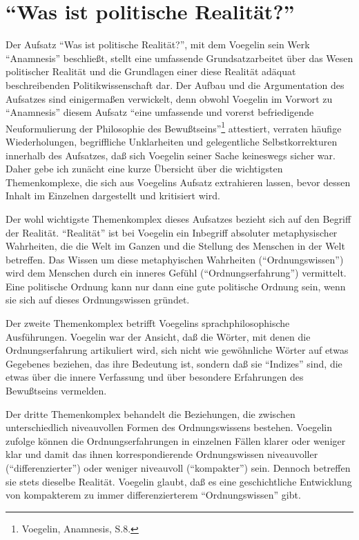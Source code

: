 


\section{"`Was ist politische Realität?"'}  

Der Aufsatz "`Was ist politische Realität?"', mit dem Voegelin sein Werk
"`Anamnesis"' beschließt, stellt eine umfassende Grundsatzarbeitet über das
Wesen politischer Realität und die Grundlagen einer diese Realität adäquat
beschreibenden Politikwissenschaft dar. Der Aufbau und die Argumentation des
Aufsatzes sind einigermaßen verwickelt, denn obwohl Voegelin im Vorwort zu
"`Anamnesis"' diesem Aufsatz "`eine umfassende und vorerst befriedigende
Neuformulierung der Philosophie des Bewußtseins"'\footnote{Voegelin,
  Anamnesis, S.8.} attestiert, verraten häufige Wiederholungen, begriffliche
Unklarheiten und gelegentliche Selbstkorrekturen innerhalb des Aufsatzes, daß
sich Voegelin seiner Sache keineswegs sicher war.  Daher gebe ich zunächt eine
kurze Übersicht über die wichtigsten Themenkomplexe, die sich aus Voegelins
Aufsatz extrahieren lassen, bevor dessen Inhalt im Einzelnen dargestellt und
kritisiert wird.

Der wohl wichtigste Themenkomplex dieses Aufsatzes bezieht sich auf den
Begriff der Realität. "`Realität"' ist bei Voegelin ein Inbegriff
absoluter metaphysischer Wahrheiten, die die Welt im Ganzen und die Stellung
des Menschen in der Welt betreffen.  Das Wissen um diese metaphyischen
Wahrheiten ("`Ordnungswissen"') wird dem Menschen durch ein inneres Gefühl
("`Ordnungserfahrung"') vermittelt. Eine politische Ordnung kann nur dann eine
gute politische Ordnung sein, wenn sie sich auf dieses Ordnungswissen
gründet.

Der zweite Themenkomplex betrifft Voegelins sprachphilosophische
Ausführungen.  Voegelin war der Ansicht, daß die Wörter, mit denen die
Ordnungserfahrung artikuliert wird, sich nicht wie gewöhnliche Wörter
auf etwas Gegebenes beziehen, das ihre Bedeutung ist, sondern daß sie
"`Indizes"' sind, die etwas über die innere Verfassung und über
besondere Erfahrungen des Bewußtseins vermelden.

Der dritte Themenkomplex behandelt die Beziehungen, die zwischen
unterschiedlich niveauvollen Formen des Ordnungswissens bestehen. Voegelin
zufolge können die Ordnungserfahrungen in einzelnen Fällen klarer oder
weniger klar und damit das ihnen korrespondierende Ordnungswissen niveauvoller
("`differenzierter"') oder weniger niveauvoll ("`kompakter"') sein. Dennoch
betreffen sie stets dieselbe Realität. Voegelin glaubt, daß es eine
geschichtliche Entwicklung von kompakterem zu immer differenzierterem
"`Ordnungswissen"' gibt.

